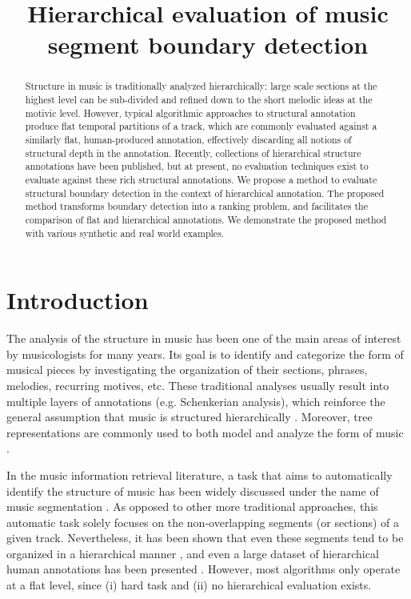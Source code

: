 \documentclass{article}
\title{Hierarchical evaluation of music segment boundary detection}
\begin{document}
%
\maketitle
%
\begin{abstract}
Structure in music is traditionally analyzed hierarchically: large scale sections at the highest level can be sub-divided and refined down to the short melodic ideas at the motivic level. 
However, typical algorithmic approaches to structural annotation produce flat temporal partitions of a track, which are commonly evaluated against a similarly flat, human-produced
annotation, effectively discarding all notions of structural depth in the annotation.
Recently, collections of hierarchical structure annotations have been published, but at present, no evaluation techniques exist to evaluate against these rich structural annotations.
We propose a method to evaluate structural boundary detection in the context of hierarchical annotation.
The proposed method transforms boundary detection into a ranking problem, and facilitates the comparison of flat and hierarchical annotations.
We demonstrate the proposed method with various synthetic and real world examples. 
\end{abstract}
%
\section{Introduction}\label{sec:introduction}

The analysis of the structure in music has been one of the main areas of interest by musicologists for many years.
Its goal is to identify and categorize the form of musical pieces by investigating the organization of their sections, phrases, melodies, recurring motives, etc.
These traditional analyses usually result into multiple layers of annotations (e.g. Schenkerian analysis), which reinforce the general assumption that music is structured hierarchically \cite{Lerdahl1983a}.
Moreover, tree representations are commonly used to both model and analyze the form of music \cite{Lerdahl1983}.

In the music information retrieval literature, a task that aims to automatically identify the structure of music has been widely discussed under the name of music segmentation \cite{Paulus2010}.
As opposed to other more traditional approaches, this automatic task solely focuses on the non-overlapping segments (or sections) of a given track.
Nevertheless, it has been shown that even these segments tend to be organized in a hierarchical manner \cite{Peeters2009}, and even a large dataset of hierarchical human annotations has been presented \cite{Smith2011}.
However, most algorithms only operate at a flat level, since (i) hard task and (ii) no hierarchical evaluation exists.
\end{document}

